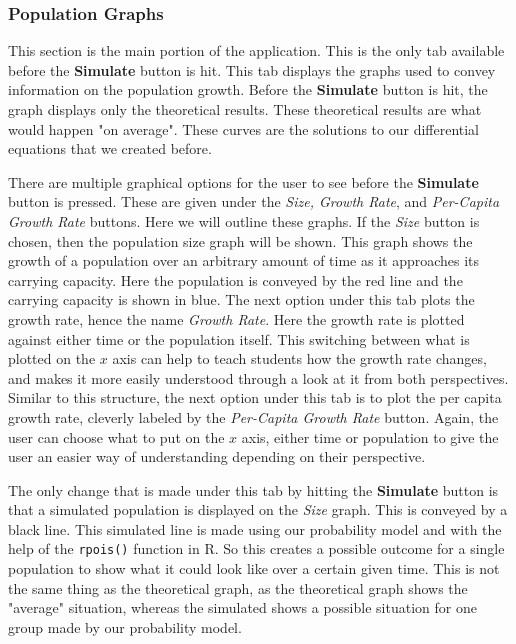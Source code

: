 \documentclass[titlepage]{article}\usepackage[]{graphicx}\usepackage[]{color}
\begin{document}
\subsubsection{Population Graphs}

This section is the main portion of the application. This is the only tab available before the \textbf{Simulate} button is hit. This tab displays the graphs used to convey information on the population growth. Before the \textbf{Simulate} button is hit, the graph displays only the theoretical results. These theoretical results are what would happen "on average". These curves are the solutions to our differential equations that we created before.

There are multiple graphical options for the user to see before the \textbf{Simulate} button is pressed. These are given under the \textit{Size, Growth Rate}, and \textit{Per-Capita Growth Rate} buttons. Here we will outline these graphs. If the \textit{Size} button is chosen, then the population size graph will be shown. This graph shows the growth of a population over an arbitrary amount of time as it approaches its carrying capacity. Here the population is conveyed by the red line and the carrying capacity is shown in blue. The next option under this tab plots the growth rate, hence the name \textit{Growth Rate}. Here the growth rate is plotted against either time or the population itself. This switching between what is plotted on the \(x\) axis can help to teach students how the growth rate changes, and makes it more easily understood through a look at it from both perspectives. Similar to this structure, the next option under this tab is to plot the per capita growth rate, cleverly labeled by the \textit{Per-Capita Growth Rate} button. Again, the user can choose what to put on the \(x\) axis, either time or population to give the user an easier way of understanding depending on their perspective.

The only change that is made under this tab by hitting the \textbf{Simulate} button is that a simulated population is displayed on the \textit{Size} graph. This is conveyed by a black line. This simulated line is made using our probability model and with the help of the \texttt{rpois()} function in R. So this creates a possible outcome for a single population to show what it could look like over a certain given time. This is not the same thing as the theoretical graph, as the theoretical graph shows the "average" situation, whereas the simulated shows a possible situation for one group made by our probability model. 
\end{document}
